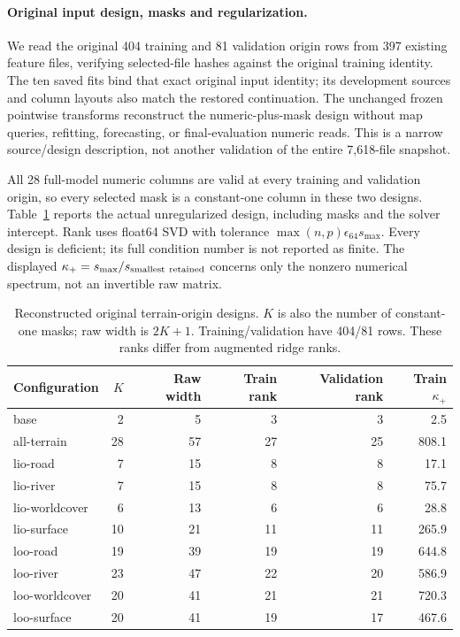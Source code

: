\paragraph{Original input design, masks and regularization.}
We read the original 404 training and 81 validation origin rows from 397
existing feature files, verifying selected-file hashes against the original
training identity. The ten saved fits bind that exact original input
identity; its development sources and column layouts also match the restored
continuation. The unchanged frozen pointwise transforms reconstruct the
numeric-plus-mask design without map queries, refitting, forecasting, or
final-evaluation numeric reads. This is a narrow source/design description,
not another validation of the entire 7,618-file snapshot.

All 28 full-model numeric columns are valid at every training and validation
origin, so every selected mask is a constant-one column in these two designs.
Table~\ref{tab:raw-terrain-design} reports the actual unregularized design,
including masks and the solver intercept. Rank uses float64 SVD with
tolerance \(\max(n,p)\epsilon_{64}s_{\max}\). Every design is deficient;
its full condition number is not reported as finite. The displayed
\(\kappa_{+}=s_{\max}/s_{\rm smallest\ retained}\) concerns only the
nonzero numerical spectrum, not an invertible raw matrix.

\begin{table}[htbp]
\centering\small
\caption{Reconstructed original terrain-origin designs. \(K\) is also the
number of constant-one masks; raw width is \(2K+1\). Training/validation
have 404/81 rows. These ranks differ from augmented ridge ranks.}
\label{tab:raw-terrain-design}\hypertarget{tab:raw-terrain-design}{}
\begin{tabular}{lrrrrr}
\toprule
Configuration & \(K\) & Raw width & Train rank & Validation rank & Train \(\kappa_{+}\)\\
\midrule
base & 2 & 5 & 3 & 3 & 2.5\\
all-terrain & 28 & 57 & 27 & 25 & 808.1\\
lio-road & 7 & 15 & 8 & 8 & 17.1\\
lio-river & 7 & 15 & 8 & 8 & 75.7\\
lio-worldcover & 6 & 13 & 6 & 6 & 28.8\\
lio-surface & 10 & 21 & 11 & 11 & 265.9\\
loo-road & 19 & 39 & 19 & 19 & 644.8\\
loo-river & 23 & 47 & 22 & 20 & 586.9\\
loo-worldcover & 20 & 41 & 21 & 21 & 720.3\\
loo-surface & 20 & 41 & 19 & 17 & 467.6\\
\bottomrule
\end{tabular}
\end{table}

